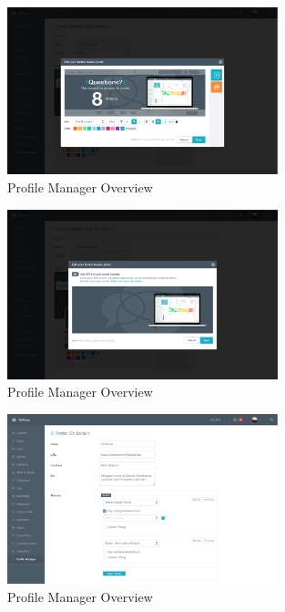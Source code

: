 \begin{figure}[H]
	\centering
	\includegraphics[width=0.7\textwidth]{Figuren/Mockups/AnnotationsDialog.png}
	\caption{Profile Manager Overview}
\end{figure} 

\begin{figure}[H]
	\centering
	\includegraphics[width=0.7\textwidth]{Figuren/Mockups/EditDialog.png}
	\caption{Profile Manager Overview}
\end{figure} 

\begin{figure}[H]
	\centering
	\includegraphics[width=0.7\textwidth]{Figuren/Mockups/EditProfile.png}
	\caption{Profile Manager Overview}
\end{figure} 
\fi








